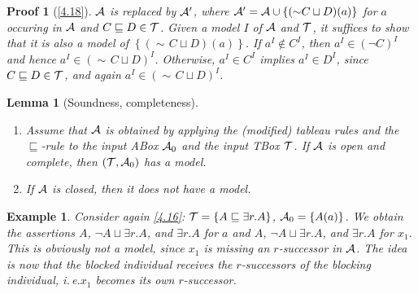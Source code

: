 \documentclass[openany]{scrbook}
\theoremstyle{break}
\newtheorem{Lemma}[Theorem]{Lemma}
\theoremstyle{nonumberbreak}
\newtheorem{Example}{Example}
\theoremstyle{nonumberplain}
\theoremstyle{nonumberbreak}
\newtheorem{Proof}{Proof}
\newcommand{\set}[1]{\left\{#1\right\}}
\newcommand{\ie}{i{.}\,e{.}\xspace}
\newcommand{\nnf}{\mathop{\sim\!}}
\begin{document}
\begin{Proof}[\cref{4.18}]
  ${\cal A}$ is replaced by ${\cal A}'$, where ${\cal A}' = {\cal A}
  \cup \set{(\nnf C \sqcup D)(a)}$ for $a$ occuring in ${\cal A}$ and
  $C \sqsubseteq D \in {\cal T}$. Given a model $I$ of ${\cal A}$ and
  ${\cal T}$, it suffices to show that it is also a model of
  $\set{(\nnf C \sqcup D)(a)}$. If $a^I \not\in C^I$, then $a^I \in
  (\neg C)^I$ and hence $a^I \in (\nnf C \sqcup D)^I$. Otherwise, $a^I
  \in C^I$ implies $a^I \in D^I$, since $C \sqsubseteq D \in {\cal
    T}$, and again $a^I \in (\nnf C \sqcup D)^I$.
\end{Proof}

\begin{Lemma}[Soundness, completeness]
  \label{4.19}
  \begin{enumerate}
  \item Assume that ${\cal A}$ is obtained by applying the (modified)
    tableau rules and the $\sqsubseteq$-rule to the input ABox ${\cal
      A}_0$ and the input TBox ${\cal T}$. If ${\cal A}$ is open and
    complete, then $({\cal T}, {\cal A}_0)$ has a model.
  \item If ${\cal A}$ is closed, then it does not have a model.
  \end{enumerate}
\end{Lemma}

\begin{Example}
  Consider again \cref{4.16}: ${\cal T} = \set{A \sqsubseteq \exists
    r. A}$, ${\cal A}_0 = \set{A(a)}$. We obtain the assertions $A$,
  $\neg A \sqcup \exists r.A$, and $\exists r.A$ for $a$ and $A$,
  $\neg A \sqcup \exists r.A$, and $\exists r.A$ for $x_1$. This is
  obviously not a model, since $x_1$ is missing an $r$-successor in
  ${\cal A}$. The idea is now that the blocked individual receives the
  $r$-successors of the blocking individual, \ie $x_1$ becomes its own
  $r$-successor.
\end{Example}
\end{document}
